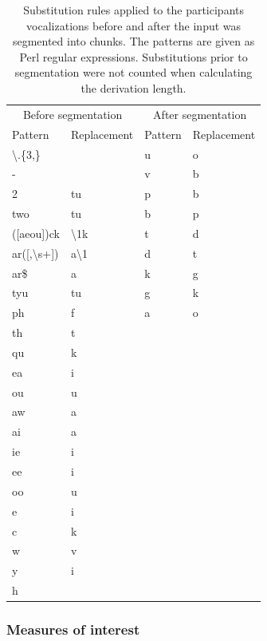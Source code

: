 \documentclass[]{article}
\begin{document}
\begin{table}

\caption{\label{tab:recall-print-substitution-rules}Substitution rules applied to the participants vocalizations before and after the input was segmented into chunks. The patterns are given as Perl regular expressions. Substitutions prior to segmentation were not counted when calculating the derivation length.}
\centering
\begin{tabular}[t]{llll}
\toprule
\multicolumn{2}{c}{Before segmentation} & \multicolumn{2}{c}{After segmentation} \\
\cmidrule(l{3pt}r{3pt}){1-2} \cmidrule(l{3pt}r{3pt}){3-4}
Pattern & Replacement & Pattern & Replacement\\
\midrule
\textbackslash{}.\{3,\} &  & u & o\\
- &  & v & b\\
2 & tu & p & b\\
two & tu & b & p\\
([aeou])ck & \textbackslash{}1k & t & d\\
\addlinespace
ar([,\textbackslash{}s+]) & a\textbackslash{}1 & d & t\\
ar\$ & a & k & g\\
tyu & tu & g & k\\
ph & f & a & o\\
th & t &  & \\
\addlinespace
qu & k &  & \\
ea & i &  & \\
ou & u &  & \\
aw & a &  & \\
ai & a &  & \\
\addlinespace
ie & i &  & \\
ee & i &  & \\
oo & u &  & \\
e & i &  & \\
c & k &  & \\
\addlinespace
w & v &  & \\
y & i &  & \\
h &  &  & \\
\bottomrule
\end{tabular}
\end{table}

\subsubsection{Measures of interest}\label{measures-of-interest}
\end{document}
